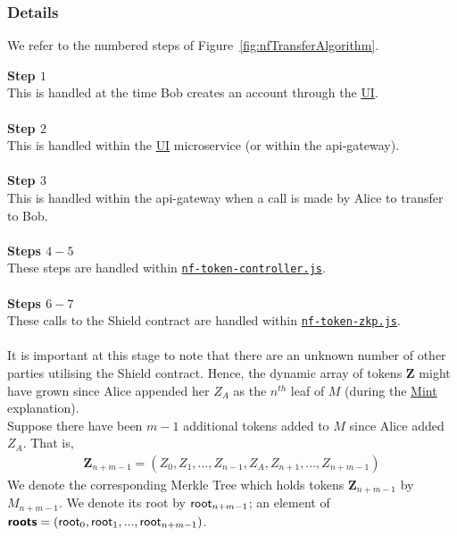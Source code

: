 \newpage
\subsubsection{Details}
\label{sec:721TransferDetails}

We refer to the numbered steps of Figure~\ref{fig:nfTransferAlgorithm}.

\textbf{Step $1$}
\ \\
This is handled at the time Bob creates an account through the \hyperref[sec:ui]{UI}.\\
\\
\textbf{Step $2$}
\ \\
This is handled within the \hyperref[sec:ui]{UI} microservice (or within the api-gateway).\\
\\
\textbf{Step $3$}
\ \\
This is handled within the api-gateway when a call is made by Alice to transfer to Bob.\\
\\
\textbf{Steps $4 - 5$}
\ \\
These steps are handled within \hyperref[sec:nf-token-controller]{\texttt{nf-token-controller.js}}.\\
\\
\textbf{Steps $6 - 7$}
\ \\
These calls to the Shield contract are handled within \hyperref[sec:nf-token-zkp]{\texttt{nf-token-zkp.js}}.\\
\\
It is important at this stage to note that there are an unknown number of other parties utilising the Shield contract.
Hence, the dynamic array of tokens $\bm{Z}$ might have grown since Alice appended her $Z_A$ as the $n^{th}$ leaf of $M$ (during the \hyperref[sec:721Mint]{Mint} explanation).\\
Suppose there have been $m-1$ additional tokens added to $M$ since Alice added $Z_A$.
That is,\\
\begin{align*}
  \bm{Z}_{n+m-1} = (Z_0, Z_1,...,Z_{n-1}, Z_A, Z_{n+1},..., Z_{n+m-1})
\end{align*}
We denote the corresponding Merkle Tree which holds tokens $\bm{Z}_{n+m-1}$ by $M_{n+m-1}$.
We denote its root by $\mathsf{root}_{n+m-1}$; an element of $\bm{\mathsf{roots}} = (\mathsf{root}_0, \mathsf{root}_1,...,\mathsf{root}_{n+m-1})$.\\
\\
